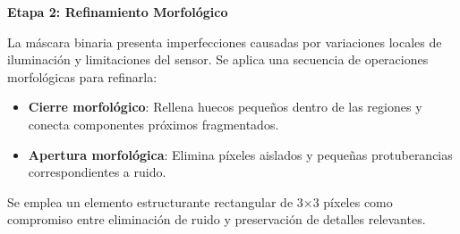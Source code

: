 \textbf{Etapa 2: Refinamiento Morfológico}

La máscara binaria presenta imperfecciones causadas por variaciones locales de iluminación y limitaciones del sensor. Se aplica una secuencia de operaciones morfológicas para refinarla:

\begin{itemize}[label=$\bullet$]
    \item \textbf{Cierre morfológico}: Rellena huecos pequeños dentro de las regiones y conecta componentes próximos fragmentados.
    \item \textbf{Apertura morfológica}: Elimina píxeles aislados y pequeñas protuberancias correspondientes a ruido.
\end{itemize}

Se emplea un elemento estructurante rectangular de 3×3 píxeles como compromiso entre eliminación de ruido y preservación de detalles relevantes.

